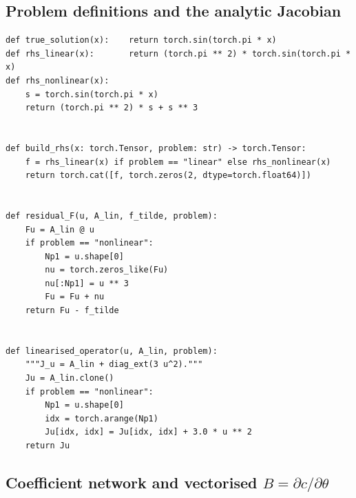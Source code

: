 \documentclass[11pt,a4paper]{article}
\begin{document}
\subsection{Problem definitions and the analytic Jacobian}

\begin{lstlisting}[caption={Residual $F(u)$ and linearised operator $J_{u}$.},label={lst:problem}]
def true_solution(x):    return torch.sin(torch.pi * x)
def rhs_linear(x):       return (torch.pi ** 2) * torch.sin(torch.pi * x)
def rhs_nonlinear(x):
    s = torch.sin(torch.pi * x)
    return (torch.pi ** 2) * s + s ** 3


def build_rhs(x: torch.Tensor, problem: str) -> torch.Tensor:
    f = rhs_linear(x) if problem == "linear" else rhs_nonlinear(x)
    return torch.cat([f, torch.zeros(2, dtype=torch.float64)])


def residual_F(u, A_lin, f_tilde, problem):
    Fu = A_lin @ u
    if problem == "nonlinear":
        Np1 = u.shape[0]
        nu = torch.zeros_like(Fu)
        nu[:Np1] = u ** 3
        Fu = Fu + nu
    return Fu - f_tilde


def linearised_operator(u, A_lin, problem):
    """J_u = A_lin + diag_ext(3 u^2)."""
    Ju = A_lin.clone()
    if problem == "nonlinear":
        Np1 = u.shape[0]
        idx = torch.arange(Np1)
        Ju[idx, idx] = Ju[idx, idx] + 3.0 * u ** 2
    return Ju
\end{lstlisting}

\subsection{Coefficient network and vectorised $B = \partial c/\partial\theta$}
\end{document}
